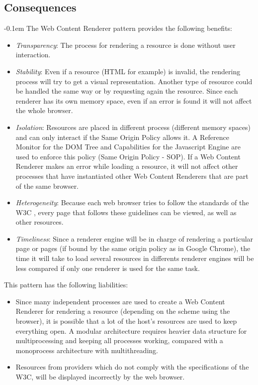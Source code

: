 \documentclass[prodmode,acmtecs]{acmsmall}
\begin{document}
  \subsection*{Consequences}
  \leftskip-0.1em The Web Content Renderer pattern provides the following benefits:
  \begin{itemize}\leftskip0.2em
    \item \textit{Transparency}: The process for rendering a resource is done without user interaction.
    \item \textit{Stability}: Even if a resource (HTML for example) is invalid, the rendering process will try to get a visual representation. Another type of resource could be handled the same way or by requesting again the resource. Since each renderer has its own memory space, even if an error is found it will not affect the whole browser.
    \item \textit{Isolation}: Resources are placed in different process (different memory spaces) and can only interact if the Same Origin Policy allows it. A Reference Monitor for the DOM Tree and Capabilities for the Javascript Engine are used to enforce this policy (Same Origin Policy - SOP). If a Web Content Renderer makes an error while loading a resource, it will not affect other processes that have instantiated other Web Content Renderers that are part of the same browser.
    \item \textit{Heterogeneity}: Because each web browser tries to follow the standards of the W3C \cite{w3c}, every page that follows these guidelines can be viewed, as well as other resources.
    \item \textit{Timeliness}: Since a renderer engine will be in charge of rendering a particular page or pages (if bound by the same origin policy as in Google Chrome), the time it will take to load several resources in differents renderer engines will be less compared if only one renderer is used for the same task.
  \end{itemize}
  This pattern has the following liabilities:
  \begin{itemize}\leftskip0.2em
    \item Since many independent processes are used to create a Web Content Renderer for rendering a resource (depending on the scheme using the browser), it is possible that a lot of the host's resources are used to keep everything open. A modular architecture requires heavier data structure for multiprocessing and keeping all processes working, compared with a monoprocess architecture with multithreading.
    \item Resources from providers which do not comply with the specifications of the W3C, will be displayed incorrectly by the web browser.
  \end{itemize}
\end{document}
